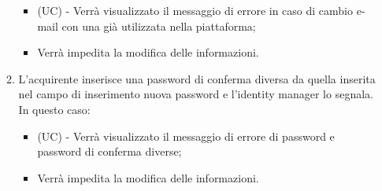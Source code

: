 \begin{itemize}
\begin{enumerate}[label=\lett]
\begin{itemize}
            \item (UC) - Verrà visualizzato il messaggio di errore in caso di cambio e-mail con una già utilizzata nella piattaforma;
            \item Verrà impedita la modifica delle informazioni.
        \end{itemize}
        \item L'acquirente inserisce una password di conferma diversa da quella inserita nel campo di inserimento nuova password e l'identity manager lo segnala. In questo caso:
        \begin{itemize}
            \item (UC) - Verrà visualizzato il messaggio di errore di password e password di conferma diverse;
            \item Verrà impedita la modifica delle informazioni.
        \end{itemize}
    \end{enumerate}
\end{itemize}

\resetSubUC

